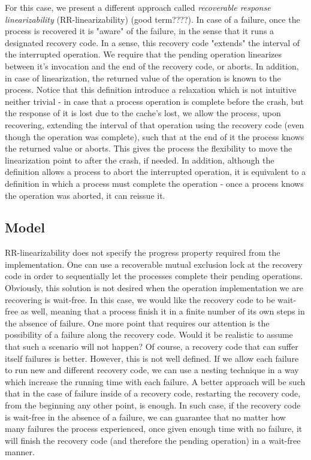 \documentclass{article}
\begin{document}
For this case, we present a different approach called \emph{recoverable response linearizability} (RR-linearizability) (good term????). In case of a failure, once the process is recovered it is "aware" of the failure, in the sense that it runs a designated recovery code. In a sense, this recovery code "extends" the interval of the interrupted operation. We require that the pending operation linearizes between it's invocation and the end of the recovery code, or aborts. In addition, in case of linearization, the returned value of the operation is known to the process. Notice that this definition introduce a relaxation which is not intuitive neither trivial - in case that a process operation is complete before the crash, but the response of it is lost due to the cache's lost, we allow the process, upon recovering, extending the interval of that operation using the recovery code (even though the operation was complete), such that at the end of it the process knows the returned value or aborts. This gives the process the flexibility to move the linearization point to after the crash, if needed. In addition, although the definition allows a process to abort the interrupted operation, it is equivalent to a definition in which a process must complete the operation - once a process knows the operation was aborted, it can reissue it.


\subsection{Model}

RR-linearizability does not specify the progress property required from the implementation. One can use a recoverable mutual exclusion lock at the recovery code in order to sequentially let the processes complete their pending operations. Obviously, this solution is not desired when the operation implementation we are recovering is wait-free. In this case, we would like the recovery code to be wait-free as well, meaning that a process finish it in a finite number of its own steps in the absence of failure. One more point that requires our attention is the possibility of a failure along the recovery code. Would it be realistic to assume that such a scenario will not happen? Of course, a recovery code that can suffer itself failures is better. However, this is not well defined. If we allow each failure to run new and different recovery code, we can use a nesting technique in a way which increase the running time with each failure. A better approach will be such that in the case of failure inside of a recovery code, restarting the recovery code, from the beginning any other point, is enough. In such case, if the recovery code is wait-free in the absence of a failure, we can guarantee that no matter how many failures the process experienced, once given enough time with no failure, it will finish the recovery code (and therefore the pending operation) in a wait-free manner.
\end{document}
